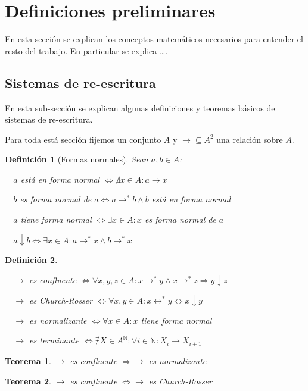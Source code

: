 \documentclass{amsbook}
\theoremstyle{customstyle}
\newtheorem{definition}{Definición}[section]
\newtheorem{theorem}{Teorema}[section]
\begin{document}
\fontsize{16pt}{19pt}\selectfont %


\section{Definiciones preliminares}

En esta sección se explican los conceptos matemáticos necesarios para entender el resto del trabajo.
En particular se explica …. %

\subsection{Sistemas de re-escritura}

En esta sub-sección se explican algunas definiciones y teoremas básicos de sistemas de re-escritura.

Para toda está sección fijemos un conjunto $A$ y $→ ⊆ A^2$ una relación sobre $A$.

\begin{definition}[Formas normales]
Sean $a, b ∈ A$:

  $a$ está en forma normal $⇔ ∄x ∈ A : a → x$

  $b$ es forma normal de $a ⇔ a →^* b ∧ b$ está en forma normal

  $a$ tiene forma normal $⇔ ∃x ∈ A : x$ es forma normal de $a$

  $a ↓ b ⇔ ∃x ∈ A : a →^* x ∧ b →^* x$
\end{definition}

\begin{definition}\ %

  $→$ es confluente $⇔ ∀x, y, z ∈ A : x →^* y ∧ x →^*z ⇒ y ↓ z$

  $→$ es Church-Rosser $⇔ ∀x, y ∈ A : x ↔^* y ⇔ x ↓ y$

  $→$ es normalizante $⇔ ∀x ∈ A : x$ tiene forma normal

  $→$ es terminante $⇔ ∄X ∈ A^ℕ : ∀i ∈ ℕ : X_i → X_{i + 1}$


\end{definition}

\begin{theorem}\label{thm:confluente ⇒ normalizante}
$→$ es confluente $⇒ →$ es normalizante
\end{theorem}

\begin{theorem}\label{thm:confluente ⇔ Church-Rosser}
  $→$ es confluente $⇔ →$ es Church-Rosser
\end{theorem}
\end{document}
